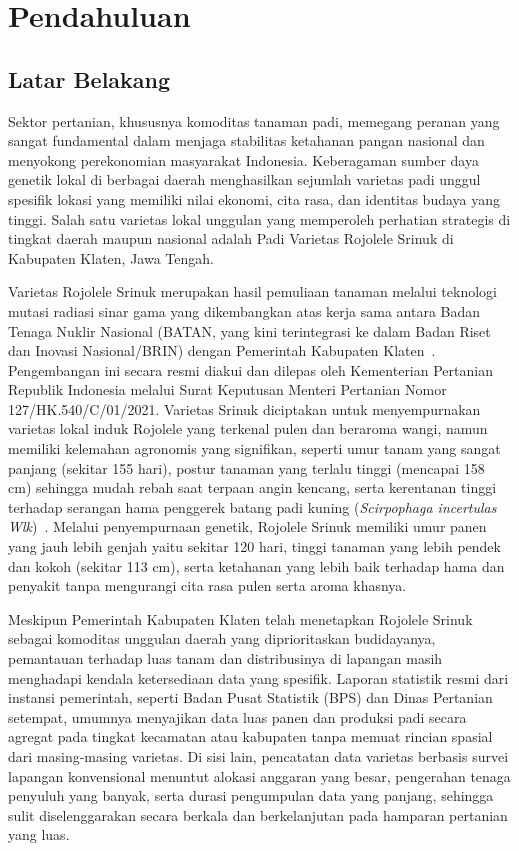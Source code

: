 \chapter{Pendahuluan}
\label{chap:intro}

\section{Latar Belakang}
\label{sec:latar_belakang}

Sektor pertanian, khususnya komoditas tanaman padi, memegang peranan yang sangat fundamental dalam menjaga stabilitas ketahanan pangan nasional dan menyokong perekonomian masyarakat Indonesia. Keberagaman sumber daya genetik lokal di berbagai daerah menghasilkan sejumlah varietas padi unggul spesifik lokasi yang memiliki nilai ekonomi, cita rasa, dan identitas budaya yang tinggi. Salah satu varietas lokal unggulan yang memperoleh perhatian strategis di tingkat daerah maupun nasional adalah Padi Varietas Rojolele Srinuk di Kabupaten Klaten, Jawa Tengah.

Varietas Rojolele Srinuk merupakan hasil pemuliaan tanaman melalui teknologi mutasi radiasi sinar gama yang dikembangkan atas kerja sama antara Badan Tenaga Nuklir Nasional (BATAN, yang kini terintegrasi ke dalam Badan Riset dan Inovasi Nasional/BRIN) dengan Pemerintah Kabupaten Klaten~\cite{batan:19:proposal}. Pengembangan ini secara resmi diakui dan dilepas oleh Kementerian Pertanian Republik Indonesia melalui Surat Keputusan Menteri Pertanian Nomor 127/HK.540/C/01/2021. Varietas Srinuk diciptakan untuk menyempurnakan varietas lokal induk Rojolele yang terkenal pulen dan beraroma wangi, namun memiliki kelemahan agronomis yang signifikan, seperti umur tanam yang sangat panjang (sekitar 155 hari), postur tanaman yang terlalu tinggi (mencapai 158 cm) sehingga mudah rebah saat terpaan angin kencang, serta kerentanan tinggi terhadap serangan hama penggerek batang padi kuning (\textit{Scirpophaga incertulas Wlk})~\cite{nurhasanah:20:evaluasi}. Melalui penyempurnaan genetik, Rojolele Srinuk memiliki umur panen yang jauh lebih genjah yaitu sekitar 120 hari, tinggi tanaman yang lebih pendek dan kokoh (sekitar 113 cm), serta ketahanan yang lebih baik terhadap hama dan penyakit tanpa mengurangi cita rasa pulen serta aroma khasnya.

Meskipun Pemerintah Kabupaten Klaten telah menetapkan Rojolele Srinuk sebagai komoditas unggulan daerah yang diprioritaskan budidayanya, pemantauan terhadap luas tanam dan distribusinya di lapangan masih menghadapi kendala ketersediaan data yang spesifik. Laporan statistik resmi dari instansi pemerintah, seperti Badan Pusat Statistik (BPS) dan Dinas Pertanian setempat, umumnya menyajikan data luas panen dan produksi padi secara agregat pada tingkat kecamatan atau kabupaten tanpa memuat rincian spasial dari masing-masing varietas. Di sisi lain, pencatatan data varietas berbasis survei lapangan konvensional menuntut alokasi anggaran yang besar, pengerahan tenaga penyuluh yang banyak, serta durasi pengumpulan data yang panjang, sehingga sulit diselenggarakan secara berkala dan berkelanjutan pada hamparan pertanian yang luas.

